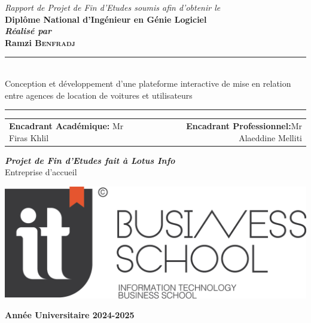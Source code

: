 \documentclass[a4paper, oneside, 12pt, final]{extreport}
\newcommand{\reportAuthor} {%
  Ramzi \textsc{Benfradj}%
}
\newcommand{\reportSubject} {%
  Conception et développement d’une plateforme interactive de mise en relation entre agences de location de voitures et utilisateurs%
}
\newcommand{\studyDepartment} {%
  Entreprise d'accueil 
  
}
\newcommand{\AU} {
\centering \textbf{Année Universitaire 2024-2025}
}
\begin{document}
\begin{titlepage}
\begin{center}
\vspace{5pt}

\vspace{15pt}
{\textit{Rapport de Projet de Fin d'Etudes soumis afin d'obtenir le}}\\

\vspace{10pt}
{\textbf{\large Diplôme National d'Ingénieur en Génie Logiciel}}\\

\vspace{5pt}
\textbf{\textit{Réalisé par}}\\
\vspace{10pt} {%
  \fontsize{14pt}{14pt}\selectfont%
  {\bfseries\Large\sc \reportAuthor}\\
}%

\vspace{5pt} {%
  \renewcommand*{\familydefault}{\defaultFont}
  \fontsize{18pt}{18pt}\selectfont%
  \rule{0.5\textwidth}{.4pt}\\
  \vspace{10pt}
  \reportSubject{}\\%
  \vspace{10pt}
  \rule{0.5\textwidth}{.4pt}
}

\vspace{5pt}

\vspace{10pt}

\begin{table}[h]
\begin{tabular}{lcr}
\textbf{Encadrant Académique:} Mr Firas Khlil      & \hfill &           \textbf{Encadrant Professionnel:}Mr Alaeddine Melliti
\end{tabular}
\end{table}





\vspace{40pt}
\textbf{\textit{Projet de Fin d'Etudes fait \`a Lotus Info}}\\
\vspace{5pt}
\studyDepartment
\centering
\includegraphics[scale=0.08]{logonoir.png}
\end{center}
\vspace{40pt}
\AU\\
\end{titlepage}
\end{document}
